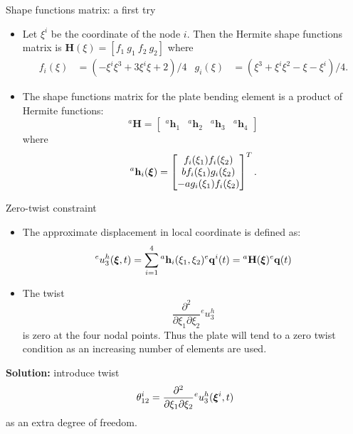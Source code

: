 \documentclass[aspectratio=169]{beamer}
\begin{document}
\begin{frame}{Shape functions matrix: a first try}
  \begin{itemize}
    \item Let $\xi^i$ be the coordinate of the node $i$. Then the Hermite shape functions matrix is $\mathbf H(\xi)=[f_1\ g_1\ f_2\ g_2]$ where
          \begin{align*}
            f_i(\xi) & =(-\xi^i\xi^3+3\xi^i\xi+2)/4 & g_i(\xi) & =(\xi^3+\xi^i\xi^2-\xi-\xi^i)/4.
          \end{align*}
    \item The shape functions matrix for the plate bending element is a product of Hermite functions:
          $${}^a\mathbf H=\begin{bmatrix}
              {}^a \mathbf h_1 & {}^a\mathbf  h_2 & {}^a \mathbf h_3 & {}^a\mathbf  h_4
            \end{bmatrix}$$ where
          $$ {}^a\mathbf  h_i(\boldsymbol\xi) =\begin{bmatrix}
              f_i(\xi_1)f_i(\xi_2)   \\
              bf_i(\xi_1)g_i(\xi_2 ) \\
              -a g_i(\xi_1)f_i(\xi_2 )
            \end{bmatrix}^T.$$
  \end{itemize}
\end{frame}

\begin{frame}{Zero-twist constraint}
  \begin{itemize}
    \item The approximate displacement in local coordinate is defined as:
          $$  {}^eu_3^h(\boldsymbol\xi,t) =\sum_{i=1}^4  {}^a\mathbf h_i(\xi_1, \xi_2) {}^e\mathbf  q^i(t)= {}^a\mathbf{H}(\boldsymbol\xi){}^e\mathbf{q}(t)$$
    \item[\XSolidBrush] The twist $$\frac{\partial^2}{\partial\xi_1\partial\xi_2}{}^eu_3^h$$ is zero at the four nodal points. Thus the plate will tend to a zero twist condition as an increasing number of elements are used.
  \end{itemize}
  \begin{block}{}
    \textbf{Solution:} introduce twist $$\theta_{12}^i=\frac{\partial^2}{\partial\xi_1\partial\xi_2}{}^eu_3^h(\boldsymbol\xi^i,t)$$ as an extra degree of freedom.
  \end{block}
\end{frame}
\end{document}
